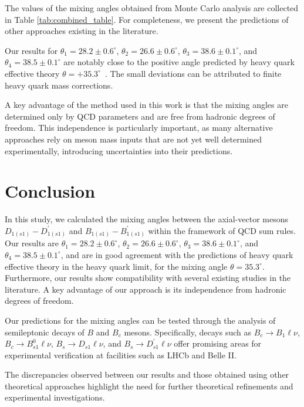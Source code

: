 \documentclass[prd,a4paper,preprint,preprintnumbers,nofootinbib,superscriptaddress]{revtex4-2}
\begin{document}
The values of the mixing angles obtained from Monte Carlo analysis are collected in Table \ref{tab:combined_table}. For completeness, we present the predictions of other approaches existing in the literature.

Our results for $\theta_1 = 28.2 \pm 0.6^\circ$, $\theta_2 = 26.6 \pm 0.6^\circ$, $\theta_3 = 38.6 \pm 0.1^\circ$, and $\theta_4 = 38.5 \pm 0.1^\circ$ are notably close to the positive angle predicted by heavy quark effective theory $\theta = +35.3^\circ$~\cite{Barnes:2002mu}. The small deviations can be attributed to finite heavy quark mass corrections.

A key advantage of the method used in this work is that the mixing angles are determined only by QCD parameters and are free from hadronic degrees of freedom. This independence is particularly important, as many alternative approaches rely on meson mass inputs that are not yet well determined experimentally, introducing  uncertainties into their predictions. 
%
\section{Conclusion}
\label{sec:4}
In this study, we calculated the mixing angles between the axial-vector mesons $D_{1(s1)} - D_{1(s1)}^\prime$ and $B_{1(s1)} - B_{1(s1)}^\prime$ within the framework of QCD sum rules. Our results are $\theta_1 = 28.2 \pm 0.6^\circ$, $\theta_2 = 26.6 \pm 0.6^\circ$, $\theta_3 = 38.6 \pm 0.1^\circ$, and $\theta_4 = 38.5 \pm 0.1^\circ$, and are in good agreement with the predictions of heavy quark effective theory in the heavy quark limit, for the mixing angle $\theta = 35.3^\circ$. Furthermore, our results show compatibility with several existing studies in the literature. A key advantage of our approach  is its independence from hadronic degrees of freedom.

Our predictions for the  mixing angles can be tested through the analysis of semileptonic decays of $B$ and $B_c$ mesons. Specifically, decays such as $B_c \to B_1 \ell \nu$, $B_c \to B_{s1}^0 \ell \nu$, $B_s \to D_{s1} \ell \nu$, and $B_s \to D_{s1}^\prime \ell \nu$ offer promising areas for experimental verification at facilities such as LHCb and Belle II. 

The discrepancies observed between our results and those obtained using other theoretical approaches highlight the need for further theoretical refinements and experimental investigations. 


\end{document}
